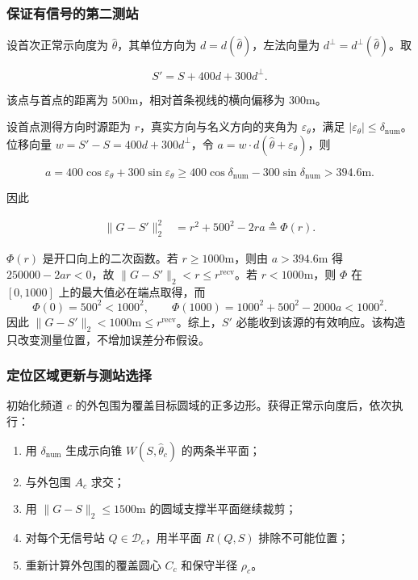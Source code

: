 \subsubsection{保证有信号的第二测站}

设首次正常示向度为 $\hat\theta$，其单位方向为 $d=d(\hat\theta)$，左法向量为 $d^{\perp}=d^{\perp}(\hat\theta)$。取

\begin{equation}
S'=S+400d+300d^{\perp}.
\label{eq:q3_safe_site}
\end{equation}

该点与首点的距离为 $500\mathrm{m}$，相对首条视线的横向偏移为 $300\mathrm{m}$。

设首点测得方向时源距为 $r$，真实方向与名义方向的夹角为 $\varepsilon_\theta$，满足 $|\varepsilon_\theta|\le\delta_{\mathrm{num}}$。位移向量 $w=S'-S=400d+300d^{\perp}$，令 $a=w\cdot d(\hat\theta+\varepsilon_\theta)$，则

\begin{equation}
a
=400\cos\varepsilon_\theta+300\sin\varepsilon_\theta
\ge400\cos\delta_{\mathrm{num}}-300\sin\delta_{\mathrm{num}}
>394.6\mathrm{m}.
\label{eq:q3_projection_bound}
\end{equation}

因此

\begin{equation}
\begin{aligned}
\lVert G-S'\rVert_2^2
&=r^2+500^2-2ra\triangleq\Phi(r).
\end{aligned}
\label{eq:q3_distance_change}
\end{equation}

$\Phi(r)$ 是开口向上的二次函数。若 $r\ge1000\mathrm{m}$，则由 $a>394.6\mathrm{m}$ 得 $250000-2ar<0$，故 $\lVert G-S'\rVert_2<r\le r^{\mathrm{recv}}$。若 $r<1000\mathrm{m}$，则 $\Phi$ 在 $[0,1000]$ 上的最大值必在端点取得，而
\[
\Phi(0)=500^2<1000^2,
\qquad
\Phi(1000)=1000^2+500^2-2000a<1000^2.
\]
因此 $\lVert G-S'\rVert_2<1000\mathrm{m}\le r^{\mathrm{recv}}$。综上，$S'$ 必能收到该源的有效响应。该构造只改变测量位置，不增加误差分布假设。

\subsubsection{定位区域更新与测站选择}

初始化频道 $c$ 的外包围为覆盖目标圆域的正多边形。获得正常示向度后，依次执行：

\begin{enumerate}
\item 用 $\delta_{\mathrm{num}}$ 生成示向锥 $W(S,\hat\theta_c)$ 的两条半平面；
\item 与外包围 $A_c$ 求交；
\item 用 $\lVert G-S\rVert_2\le1500\mathrm{m}$ 的圆域支撑半平面继续裁剪；
\item 对每个无信号站 $Q\in\mathcal D_c$，用半平面 $R(Q,S)$ 排除不可能位置；
\item 重新计算外包围的覆盖圆心 $C_c$ 和保守半径 $\rho_c$。
\end{enumerate}

